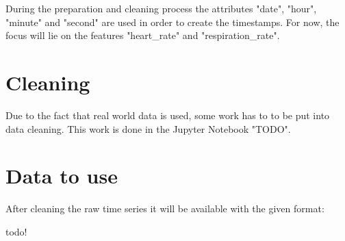 During the preparation and cleaning process the attributes "date", "hour", "minute" and "second" are used in order to create the timestamps.
For now, the focus will lie on the features "heart\_rate" and "respiration\_rate".


\section{Cleaning}
Due to the fact that real world data is used, some work has to to be put into data cleaning. This work is done in the Jupyter Notebook "TODO".


\section{Data to use}
After cleaning the raw time series it will be available with the given format:

todo!





